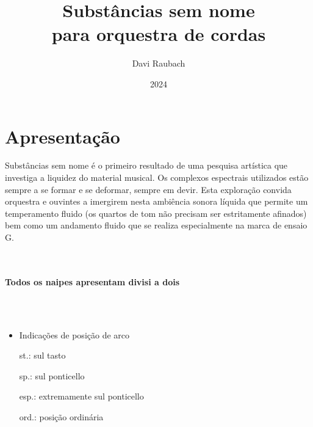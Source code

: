 \documentclass[11pt]{article}
\author{Davi Raubach}
\date{2024}
\title{Substâncias sem nome\\\medskip
\large para orquestra de cordas}
\begin{document}
\maketitle

\section{Apresentação}
\label{sec:orgc3d98bf}
Substâncias sem nome é o primeiro resultado de uma pesquisa artística que investiga a liquidez do material musical. Os complexos espectrais utilizados estão sempre a se formar e se deformar, sempre em devir. Esta exploração convida orquestra e ouvintes a imergirem nesta ambiência sonora líquida que permite um temperamento fluido (os quartos de tom não precisam ser estritamente afinados) bem como um andamento fluido que se realiza especialmente na marca de ensaio G.

\\[0pt]
\\[0pt]

\textbf{Todos os naipes apresentam divisi a dois}

\\[0pt]
\\[0pt]

\begin{itemize}
\item Indicações de posição de arco

st.: sul tasto

sp.: sul ponticello

esp.: extremamente sul ponticello

ord.: posição ordinária
\end{itemize}
\end{document}
